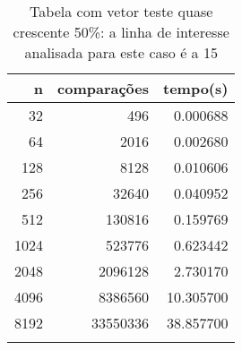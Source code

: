 \begin{table}[ht]
\centering
\begin{tabular}{rrr} \toprule
        n &    comparações &       tempo(s) \\ \midrule
      32  &            496 &      0.000688 \\
      64  &           2016 &      0.002680 \\
     128  &           8128 &      0.010606 \\
     256  &          32640 &      0.040952 \\
     512  &         130816 &      0.159769 \\
    1024  &         523776 &      0.623442 \\
    2048  &        2096128 &      2.730170 \\
    4096  &        8386560 &     10.305700 \\
    8192  &       33550336 &     38.857700 \\
\bottomrule\addlinespace
\end{tabular}
\caption{Tabela com vetor teste quase crescente 50\%: a linha de interesse analisada para este caso é a 15}
\label{tab:bolhaQuaseCresc50}
\end{table}
